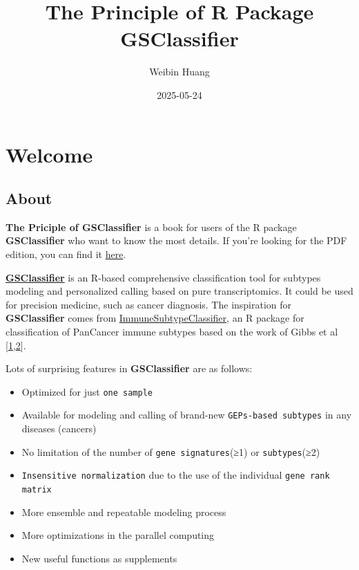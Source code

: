 \documentclass[
  12pt,
]{book}
\title{The Principle of R Package GSClassifier}
\author{Weibin Huang}
\date{2025-05-24}
\newcommand{\passthrough}[1]{#1}
\begin{document}
\maketitle

{
\hypersetup{linkcolor=}
\setcounter{tocdepth}{2}
\tableofcontents
}
\hypertarget{welcome}{%
\chapter*{Welcome}\label{welcome}}

\hypertarget{about}{%
\section*{About}\label{about}}

\textbf{The Priciple of GSClassifier} is a book for users of the R package \textbf{GSClassifier} who want to know the most details. If you're looking for the PDF edition, you can find it \href{https://github.com/huangwb8/GSClassifier.principle/blob/master/docs/GSClassifier.principle.pdf}{here}.

\href{https://github.com/huangwb8/GSClassifier}{\textbf{GSClassifier}} is an R-based comprehensive classification tool for subtypes modeling and personalized calling based on pure transcriptomics. It could be used for precision medicine, such as cancer diagnosis. The inspiration for \textbf{GSClassifier} comes from \href{https://github.com/CRI-iAtlas/ImmuneSubtypeClassifier}{ImmuneSubtypeClassifier}, an R package for classification of PanCancer immune subtypes based on the work of Gibbs et al {[}\protect\hyperlink{ref-RN160}{1},\protect\hyperlink{ref-RN315}{2}{]}.

Lots of surprising features in \textbf{GSClassifier} are as follows:

\begin{itemize}
\item
  Optimized for just \passthrough{\lstinline!one sample!}
\item
  Available for modeling and calling of brand-new \passthrough{\lstinline!GEPs-based subtypes!} in any diseases (cancers)
\item
  No limitation of the number of \passthrough{\lstinline!gene signatures!}(≥1) or \passthrough{\lstinline!subtypes!}(≥2)
\item
  \passthrough{\lstinline!Insensitive normalization!} due to the use of the individual \passthrough{\lstinline!gene rank matrix!}
\item
  More ensemble and repeatable modeling process
\item
  More optimizations in the parallel computing
\item
  New useful functions as supplements
\end{itemize}
\end{document}
